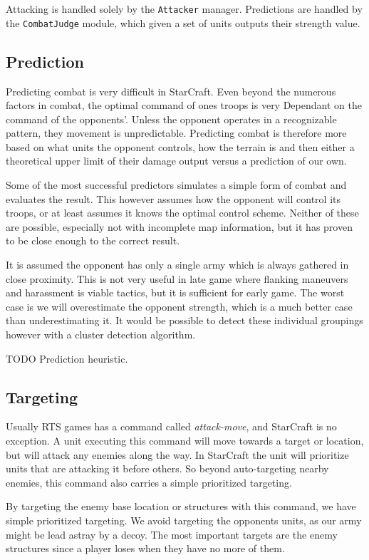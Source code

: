 Attacking is handled solely by the \texttt{Attacker} manager. Predictions are handled by the \texttt{CombatJudge} module, which given a set of units outputs their strength value.

	\subsection*{Prediction}
	Predicting combat is very difficult in StarCraft. Even beyond the numerous factors in combat, the optimal command of ones troops is very Dependant on the command of the opponents'. Unless the opponent operates in a recognizable pattern, they movement is unpredictable. Predicting combat is therefore more based on what units the opponent controls, how the terrain is and then either a theoretical upper limit of their damage output versus a prediction of our own.
	
	Some of the most successful predictors simulates a simple form of combat and evaluates the result. This however assumes how the opponent will control its troops, or at least assumes it knows the optimal control scheme. Neither of these are possible, especially not with incomplete map information, but it has proven to be close enough to the correct result.
	
	It is assumed the opponent has only a single army which is always gathered in close proximity. This is not very useful in late game where flanking maneuvers and harassment is viable tactics, but it is sufficient for early game. The worst case is we will overestimate the opponent strength, which is a much better case than underestimating it. It would be possible to detect these individual groupings however with a cluster detection algorithm.
	
	TODO Prediction heuristic.
	
	\subsection*{Targeting}
	Usually RTS games has a command called \emph{attack-move}, and StarCraft is no exception. A unit executing this command will move towards a target or location, but will attack any enemies along the way. In StarCraft the unit will prioritize units that are attacking it before others. So beyond auto-targeting nearby enemies, this command also carries a simple prioritized targeting.
	
	By targeting the enemy base location or structures with this command, we have simple prioritized targeting. We avoid targeting the opponents units, as our army might be lead astray by a decoy. The most important targets are the enemy structures since a player loses when they have no more of them.
	
